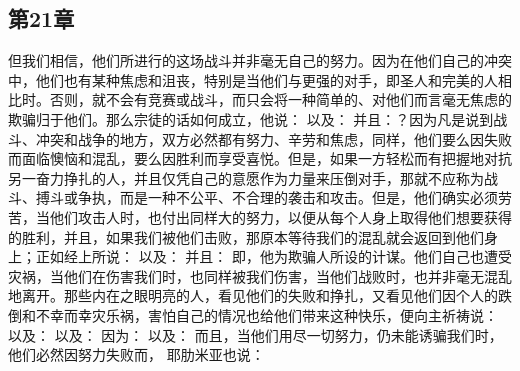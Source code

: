 \subsection{第21章}

\par

但我们相信，他们所进行的这场战斗并非毫无自己的努力。因为在他们自己的冲突中，他们也有某种焦虑和沮丧，特别是当他们与更强的对手，即圣人和完美的人相比时。否则，就不会有竞赛或战斗，而只会将一种简单的、对他们而言毫无焦虑的欺骗归于他们。那么宗徒的话如何成立，他说： 以及： 并且：？因为凡是说到战斗、冲突和战争的地方，双方必然都有努力、辛劳和焦虑，同样，他们要么因失败而面临懊恼和混乱，要么因胜利而享受喜悦。但是，如果一方轻松而有把握地对抗另一奋力挣扎的人，并且仅凭自己的意愿作为力量来压倒对手，那就不应称为战斗、搏斗或争执，而是一种不公平、不合理的袭击和攻击。但是，他们确实必须劳苦，当他们攻击人时，也付出同样大的努力，以便从每个人身上取得他们想要获得的胜利，并且，如果我们被他们击败，那原本等待我们的混乱就会返回到他们身上；正如经上所说： 以及： 并且： 即，他为欺骗人所设的计谋。他们自己也遭受灾祸，当他们在伤害我们时，也同样被我们伤害，当他们战败时，也并非毫无混乱地离开。那些内在之眼明亮的人，看见他们的失败和挣扎，又看见他们因个人的跌倒和不幸而幸灾乐祸，害怕自己的情况也给他们带来这种快乐，便向主祈祷说： 以及： 以及： 因为： 以及： 而且，当他们用尽一切努力，仍未能诱骗我们时，他们必然因努力失败而， 耶肋米亚也说：  